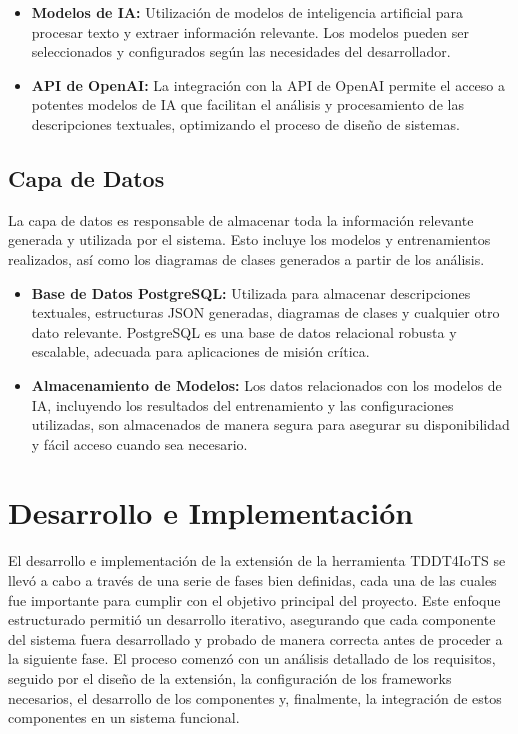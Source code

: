 \begin{itemize}
	\item \textbf{Modelos de IA:} Utilización de modelos de inteligencia artificial para procesar texto y extraer información relevante. Los modelos pueden ser seleccionados y configurados según las necesidades del desarrollador.
	\item \textbf{API de OpenAI:} La integración con la API de OpenAI permite el acceso a potentes modelos de IA que facilitan el análisis y procesamiento de las descripciones textuales, optimizando el proceso de diseño de sistemas.
\end{itemize}

\subsection{Capa de Datos}

La capa de datos es responsable de almacenar toda la información relevante generada y utilizada por el sistema. Esto incluye los modelos y entrenamientos realizados, así como los diagramas de clases generados a partir de los análisis.

\begin{itemize}
	\item \textbf{Base de Datos PostgreSQL:} Utilizada para almacenar descripciones textuales, estructuras JSON generadas, diagramas de clases y cualquier otro dato relevante. PostgreSQL es una base de datos relacional robusta y escalable, adecuada para aplicaciones de misión crítica.
	\item \textbf{Almacenamiento de Modelos:} Los datos relacionados con los modelos de IA, incluyendo los resultados del entrenamiento y las configuraciones utilizadas, son almacenados de manera segura para asegurar su disponibilidad y fácil acceso cuando sea necesario.
\end{itemize}

\section{Desarrollo e Implementación}

El desarrollo e implementación de la extensión de la herramienta TDDT4IoTS se llevó a cabo a través de una serie de fases bien definidas, cada una de las cuales fue importante para cumplir con el objetivo principal del proyecto. Este enfoque estructurado permitió un desarrollo iterativo, asegurando que cada componente del sistema fuera desarrollado y probado de manera correcta antes de proceder a la siguiente fase. El proceso comenzó con un análisis detallado de los requisitos, seguido por el diseño de la extensión, la configuración de los frameworks necesarios, el desarrollo de los componentes y, finalmente, la integración de estos componentes en un sistema funcional.

